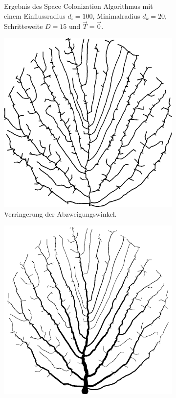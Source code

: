 \begin{figure} [hbtp]
\begin{subfigure}[t]{.4\textwidth}
		\caption{Ergebnis des Space Colonization Algorithmus mit einem Einflussradius $d_i = 100$, Minimalradius $d_k = 20$, Schritteweite $D = 15$ und $\overrightarrow{T} = \overrightarrow{0}$.}
		\label{subfig:SCA_Extended2}
	\end{subfigure}
	\begin{subfigure}[t]{.4\textwidth}
		\centering
		\includegraphics[width=\linewidth]{images/SCA_Extended3.png}
		\caption{Verringerung der Abzweigungswinkel.}
		\label{subfig:SCA_Extended3}
	\end{subfigure}
	\hspace{.1\textwidth}
	\begin{subfigure}[t]{.4\textwidth}
		\centering
		\includegraphics[width=\linewidth]{images/SCA_Extended4.png}

\end{subfigure}
\end{figure}
